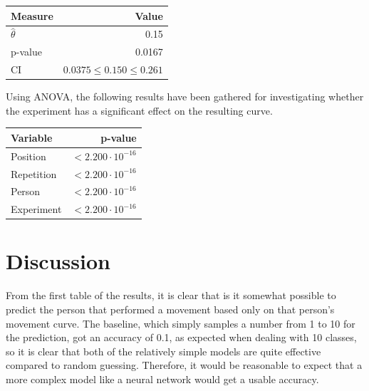 \documentclass[11pt, fleqn, titlepage]{article}
\begin{document}
\begin{table}[H]
	\centering
	\begin{tabular}{l r}
		\toprule
		Measure        & Value                          \\ \midrule
		$\hat{\theta}$ & 0.15                           \\ 
		p-value        & 0.0167                         \\ 
		CI             & $0.0375 \leq 0.150 \leq 0.261$ \\ \bottomrule
	\end{tabular}
\end{table}

\noindent Using ANOVA, the following results have been gathered for investigating whether the experiment has a significant effect on the resulting curve.

\begin{table}[H]
	\centering
	\begin{tabular}{l r}
		\toprule
		Variable       & p-value                         \\ \midrule
		Position       & $<2.200 \cdot 10^{-16}$         \\ 
		Repetition     & $<2.200 \cdot 10^{-16}$         \\ 
		Person         & $<2.200 \cdot 10^{-16}$         \\ 
		Experiment     & $<2.200 \cdot 10^{-16}$         \\ \bottomrule
	\end{tabular}
\end{table}




\section{Discussion}
From the first table of the results, it is clear that is it somewhat possible to predict the person that performed a movement based only on that person's movement curve. The baseline, which simply samples a number from 1 to 10 for the prediction, got an accuracy of 0.1, as expected when dealing with 10 classes, so it is clear that both of the relatively simple models are quite effective compared to random guessing. Therefore, it would be reasonable to expect that a more complex model like a neural network would get a usable accuracy.
\end{document}

